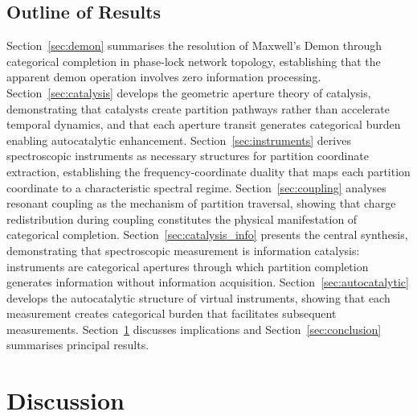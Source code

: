 \documentclass[12pt,a4paper]{article}
\theoremstyle{definition}
\theoremstyle{remark}
\begin{document}
\subsection{Outline of Results}

Section~\ref{sec:demon} summarises the resolution of Maxwell's Demon through categorical completion in phase-lock network topology, establishing that the apparent demon operation involves zero information processing. Section~\ref{sec:catalysis} develops the geometric aperture theory of catalysis, demonstrating that catalysts create partition pathways rather than accelerate temporal dynamics, and that each aperture transit generates categorical burden enabling autocatalytic enhancement. Section~\ref{sec:instruments} derives spectroscopic instruments as necessary structures for partition coordinate extraction, establishing the frequency-coordinate duality that maps each partition coordinate to a characteristic spectral regime. Section~\ref{sec:coupling} analyses resonant coupling as the mechanism of partition traversal, showing that charge redistribution during coupling constitutes the physical manifestation of categorical completion. Section~\ref{sec:catalysis_info} presents the central synthesis, demonstrating that spectroscopic measurement is information catalysis: instruments are categorical apertures through which partition completion generates information without information acquisition. Section~\ref{sec:autocatalytic} develops the autocatalytic structure of virtual instruments, showing that each measurement creates categorical burden that facilitates subsequent measurements. Section~\ref{sec:discussion} discusses implications and Section~\ref{sec:conclusion} summarises principal results.









\section{Discussion}
\label{sec:discussion}
\end{document}
